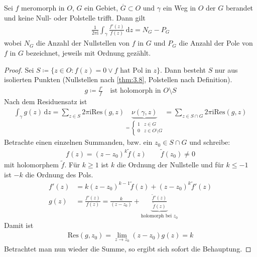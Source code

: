 \begin{theorem} \label{thm:4.21}
  Sei $f$ meromorph in $O$, $G$ ein Gebiet, $\overline{G} \subset O$ und $\gamma$ ein Weg in $O$ der $G$ berandet und keine Null- oder Polstelle trifft. Dann gilt
  \begin{align*}
    \frac{1}{2\pi \mathrm{i}} \int_\gamma \frac{f'(z)}{f(z)} \, \mathrm{d}z = N_G - P_G
  \end{align*}
  wobei $N_G$ die Anzahl der Nullstellen von $f$ in $G$ und $P_G$ die Anzahl der Pole von $f$ in $G$ bezeichnet, jeweils mit Ordnung gezählt.

  \begin{proof}
    Sei $S \coloneq \{ z \in O : f(z) = 0 \lor f\text{ hat Pol in }z \}$.
    Dann besteht $S$ nur aus isolierten Punkten (Nullstellen nach \ref{thm:3.8}, Polstellen nach Definition).
    \begin{align*}
      g \coloneq \frac{f'}{f} \quad \text{ist holomorph in $O \setminus S$}
    \end{align*}
    Nach dem Residuensatz ist
    \begin{align*}
      \int_\gamma g(z) \, \mathrm dz = \sum_{z \in S} 2 \pi \mathrm{i} \mathrm{Res}(g,z) \underbrace{\nu(\gamma,z)}_{= \begin{cases} 1 & z \in G \\ 0 & z \in O \setminus G \end{cases}} = \sum_{z \in S \cap G} 2 \pi \mathrm{i} \mathrm{Res}(g,z)
    \end{align*}
    Betrachte einen einzelnen Summanden, bzw. ein $z_0 \in S \cap G$ und schreibe:
    \begin{align*}
      f(z) = (z-z_0)^k \widetilde{f}(z) \qquad \widetilde{f}(z_0) \neq 0
    \end{align*}
    mit holomorphem $\widetilde{f}$.
    Für $k\ge 1$ ist $k$ die Ordnung der Nullstelle und für $k \le -1$ ist $-k$ die Ordnung des Pols.
    \begin{align*}
      f'(z) &= k (z-z_0)^{k-1} \widetilde{f}(z) + (z-z_0)^k \widetilde{f}'(z) \\
      g(z) &= \frac{f'(z)}{f(z)} = \frac{k}{(z-z_0)} + \underbrace{\frac{\widetilde{f}'(z)}{\widetilde{f}(z)}}_{\text{holomorph bei $z_0$}}
    \end{align*}
    Damit ist
    \begin{align*}
      \mathrm{Res}(g,z_0) = \lim\limits_{z \to z_0} (z-z_0) g(z) = k
    \end{align*}
    Betrachtet man nun wieder die Summe, so ergibt sich sofort die Behauptung.
  \end{proof}
\end{theorem}

